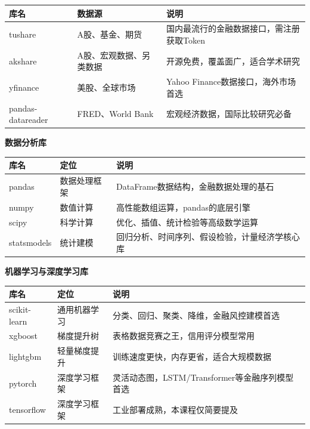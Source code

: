 \begin{table}[H]
\centering
\small
\begin{tabular}{llp{6cm}}
\toprule
\textbf{库名} & \textbf{数据源} & \textbf{说明} \\
\midrule
tushare & A股、基金、期货 & 国内最流行的金融数据接口，需注册获取Token \\
akshare & A股、宏观数据、另类数据 & 开源免费，覆盖面广，适合学术研究 \\
yfinance & 美股、全球市场 & Yahoo Finance数据接口，海外市场首选 \\
pandas-datareader & FRED、World Bank & 宏观经济数据，国际比较研究必备 \\
\bottomrule
\end{tabular}
\end{table}

\textbf{数据分析库}

\begin{table}[H]
\centering
\small
\begin{tabular}{llp{6cm}}
\toprule
\textbf{库名} & \textbf{定位} & \textbf{说明} \\
\midrule
pandas & 数据处理框架 & DataFrame数据结构，金融数据处理的基石 \\
numpy & 数值计算 & 高性能数组运算，pandas的底层引擎 \\
scipy & 科学计算 & 优化、插值、统计检验等高级数学运算 \\
statsmodels & 统计建模 & 回归分析、时间序列、假设检验，计量经济学核心库 \\
\bottomrule
\end{tabular}
\end{table}

\textbf{机器学习与深度学习库}

\begin{table}[H]
\centering
\small
\begin{tabular}{llp{6cm}}
\toprule
\textbf{库名} & \textbf{定位} & \textbf{说明} \\
\midrule
scikit-learn & 通用机器学习 & 分类、回归、聚类、降维，金融风控建模首选 \\
xgboost & 梯度提升树 & 表格数据竞赛之王，信用评分模型常用 \\
lightgbm & 轻量梯度提升 & 训练速度更快，内存更省，适合大规模数据 \\
pytorch & 深度学习框架 & 灵活动态图，LSTM/Transformer等金融序列模型首选 \\
tensorflow & 深度学习框架 & 工业部署成熟，本课程仅简要提及 \\
\bottomrule
\end{tabular}
\end{table}

